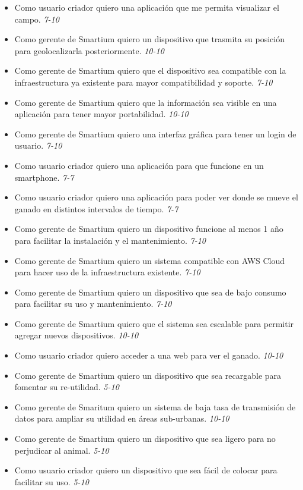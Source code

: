 \documentclass[11pt]{charter}
\begin{document}
\begin{itemize}
\item Como usuario criador quiero una aplicación que me permita visualizar el campo. \textit{7-10}
\item Como gerente de Smartium quiero un dispositivo que trasmita su posición para geolocalizarla posteriormente. \textit{10-10}
\item Como gerente de Smartium quiero que el dispositivo sea compatible con la infraestructura ya existente para mayor compatibilidad y soporte. \textit{7-10}
\item Como gerente de Smartium quiero que la información sea visible en una aplicación para tener mayor portabilidad. \textit{10-10}
\item Como gerente de Smartium quiero una interfaz gráfica para tener un login de usuario. \textit{7-10}
\item Como usuario criador quiero una aplicación para que funcione en un smartphone. \textit{7-7}
\item Como usuario criador quiero una aplicación para poder ver donde se mueve el ganado en distintos intervalos de tiempo. \textit{7-7}
\item Como gerente de Smartium quiero un dispositivo funcione al menos 1 año para facilitar la instalación y el mantenimiento. \textit{7-10}
\item Como gerente de Smartium quiero un sistema compatible con AWS  Cloud para hacer uso de la infraestructura existente. \textit{7-10}
\item Como gerente de Smartium quiero un dispositivo que sea de bajo consumo para facilitar su uso y mantenimiento. \textit{7-10}
\item Como gerente de Smartium quiero que el sistema sea escalable para permitir agregar nuevos dispositivos. \textit{10-10}
\item Como usuario criador quiero acceder a una web para ver el ganado. \textit{10-10}
\item Como gerente de Smartium quiero un dispositivo que sea recargable para fomentar su re-utilidad. \textit{5-10}
\item Como gerente de Smaritum quiero un sistema de baja tasa de transmisión de datos para ampliar su utilidad en áreas sub-urbanas. \textit{10-10}
\item Como gerente de Smartium quiero un dispositivo que sea ligero para no perjudicar al animal. \textit{5-10}
\item Como usuario criador quiero un dispositivo que sea fácil de colocar para facilitar su uso. \textit{5-10}

\end{itemize}
\end{document}
